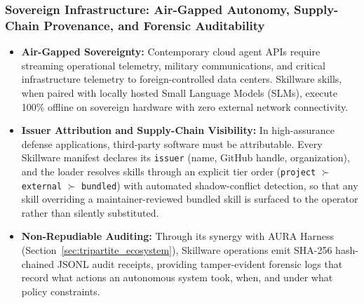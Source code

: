 \subsubsection{Sovereign Infrastructure: Air-Gapped Autonomy, Supply-Chain Provenance, and Forensic Auditability}
\begin{itemize}[leftmargin=*]
  \item \textbf{Air-Gapped Sovereignty:} Contemporary cloud agent APIs require streaming operational telemetry, military communications, and critical infrastructure telemetry to foreign-controlled data centers. Skillware skills, when paired with locally hosted Small Language Models (SLMs), execute 100\% offline on sovereign hardware with zero external network connectivity.
  \item \textbf{Issuer Attribution and Supply-Chain Visibility:} In high-assurance defense applications, third-party software must be attributable. Every Skillware manifest declares its \texttt{issuer} (name, GitHub handle, organization), and the loader resolves skills through an explicit tier order (\texttt{project} $\succ$ \texttt{external} $\succ$ \texttt{bundled}) with automated shadow-conflict detection, so that any skill overriding a maintainer-reviewed bundled skill is surfaced to the operator rather than silently substituted.
  \item \textbf{Non-Repudiable Auditing:} Through its synergy with AURA Harness (Section~\ref{sec:tripartite_ecosystem}), Skillware operations emit SHA-256 hash-chained JSONL audit receipts, providing tamper-evident forensic logs that record what actions an autonomous system took, when, and under what policy constraints.
\end{itemize}
